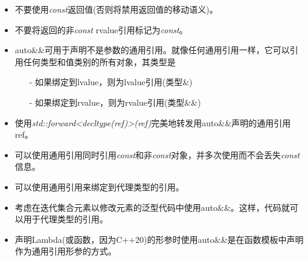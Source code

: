 \begin{itemize}
	\item 不要使用\textit{const}返回值(否则将禁用返回值的移动语义)。
	\item 不要将返回的非\textit{const} rvalue引用标记为\textit{const}。
	\item auto\&\&可用于声明不是参数的通用引用。就像任何通用引用一样，它可以引用任何类型和值类别的所有对象，其类型是
	\begin{itemize}
		\item[-] 如果绑定到lvalue，则为lvalue引用(类型\&)
		\item[-] 如果绑定到rvalue，则为rvalue引用(类型\&\&)
	\end{itemize}
	\item 使用\textit{std::forward<decltype(ref)>(ref)}完美地转发用auto\&\&声明的通用引用ref。
	\item 可以使用通用引用同时引用\textit{const}和非\textit{const}对象，并多次使用而不会丢失\textit{const}信息。
	\item 可以使用通用引用来绑定到代理类型的引用。
	\item 考虑在迭代集合元素以修改元素的泛型代码中使用auto\&\&。这样，代码就可以用于代理类型的引用。
	\item 声明Lambda(或函数，因为C++20)的形参时使用auto\&\&是在函数模板中声明作为通用引用形参的方式。
\end{itemize}


\newpage